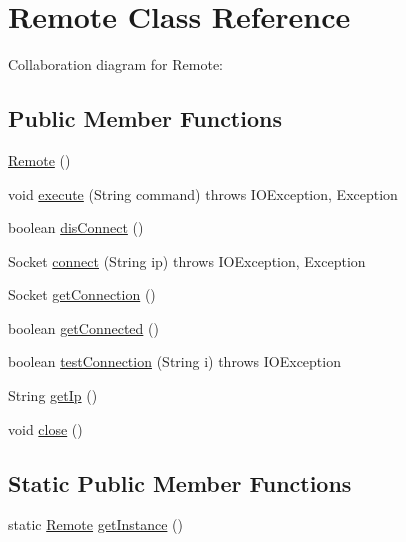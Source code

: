 \hypertarget{classcom_1_1axcoto_1_1shinjuku_1_1maki_1_1_remote}{\section{\-Remote \-Class \-Reference}
\label{classcom_1_1axcoto_1_1shinjuku_1_1maki_1_1_remote}
}


\-Collaboration diagram for \-Remote\-:
\subsection*{\-Public \-Member \-Functions}
\begin{DoxyCompactItemize}
\item 
\hyperlink{classcom_1_1axcoto_1_1shinjuku_1_1maki_1_1_remote_a788955b106b4417456ce5228a699c2ca}{\-Remote} ()
\item 
void \hyperlink{classcom_1_1axcoto_1_1shinjuku_1_1maki_1_1_remote_a1d6ee937b4c42ba06093c71a06adac7b}{execute} (\-String command)  throws I\-O\-Exception, Exception 
\item 
boolean \hyperlink{classcom_1_1axcoto_1_1shinjuku_1_1maki_1_1_remote_a3d98022421bd577091e44ae493f879f4}{dis\-Connect} ()
\item 
\-Socket \hyperlink{classcom_1_1axcoto_1_1shinjuku_1_1maki_1_1_remote_ab14cd875029df52c2b797ba52b7b6c96}{connect} (\-String ip)  throws I\-O\-Exception, Exception 
\item 
\-Socket \hyperlink{classcom_1_1axcoto_1_1shinjuku_1_1maki_1_1_remote_ab2c6f4020b1e02762c63da1e54ec0492}{get\-Connection} ()
\item 
boolean \hyperlink{classcom_1_1axcoto_1_1shinjuku_1_1maki_1_1_remote_ac626bca838000f09bc3565bcc12c07ac}{get\-Connected} ()
\item 
boolean \hyperlink{classcom_1_1axcoto_1_1shinjuku_1_1maki_1_1_remote_a72560515167edd869e2d4c3e88a49ae1}{test\-Connection} (\-String i)  throws I\-O\-Exception
\item 
\-String \hyperlink{classcom_1_1axcoto_1_1shinjuku_1_1maki_1_1_remote_a7f6ad1fbb8ddfbceb2416ca94574252a}{get\-Ip} ()
\item 
void \hyperlink{classcom_1_1axcoto_1_1shinjuku_1_1maki_1_1_remote_a5ae591df94fc66ccb85cbb6565368bca}{close} ()
\end{DoxyCompactItemize}
\subsection*{\-Static \-Public \-Member \-Functions}
\begin{DoxyCompactItemize}
\item 
static \hyperlink{classcom_1_1axcoto_1_1shinjuku_1_1maki_1_1_remote}{\-Remote} \hyperlink{classcom_1_1axcoto_1_1shinjuku_1_1maki_1_1_remote_ab114be717412af726ae58f4f27feb3a1}{get\-Instance} ()
\end{DoxyCompactItemize}
